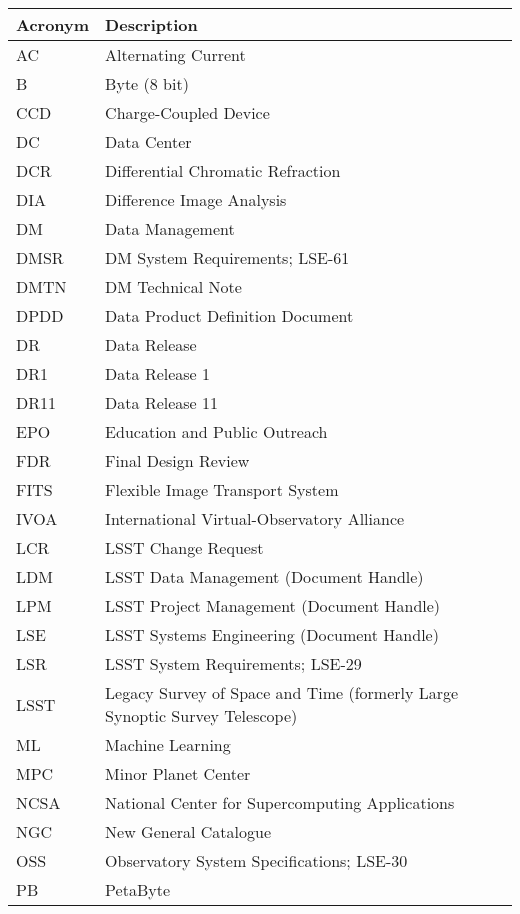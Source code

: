 \addtocounter{table}{-1}
\begin{longtable}{p{}p{}}\hline
\textbf{Acronym} & \textbf{Description}  \\\hline

AC & Alternating Current \\\hline
B & Byte (8 bit) \\\hline
CCD & Charge-Coupled Device \\\hline
DC & Data Center \\\hline
DCR & Differential Chromatic Refraction \\\hline
DIA & Difference Image Analysis \\\hline
DM & Data Management \\\hline
DMSR & DM System Requirements; LSE-61 \\\hline
DMTN & DM Technical Note \\\hline
DPDD & Data Product Definition Document \\\hline
DR & Data Release \\\hline
DR1 & Data Release 1 \\\hline
DR11 & Data Release 11 \\\hline
EPO & Education and Public Outreach \\\hline
FDR & Final Design Review \\\hline
FITS & Flexible Image Transport System \\\hline
IVOA & International Virtual-Observatory Alliance \\\hline
LCR & LSST Change Request \\\hline
LDM & LSST Data Management (Document Handle) \\\hline
LPM & LSST Project Management (Document Handle) \\\hline
LSE & LSST Systems Engineering (Document Handle) \\\hline
LSR & LSST System Requirements; LSE-29 \\\hline
LSST & Legacy Survey of Space and Time (formerly Large Synoptic Survey Telescope) \\\hline
ML & Machine Learning \\\hline
MPC & Minor Planet Center \\\hline
NCSA & National Center for Supercomputing Applications \\\hline
NGC & New General Catalogue \\\hline
OSS & Observatory System Specifications; LSE-30 \\\hline
PB & PetaByte \\\hline

\end{longtable}
